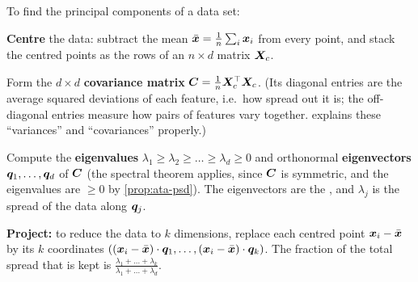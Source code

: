 \begin{algorithm}\label{alg:pca}
To find the principal components of a data set:
\begin{steps}
  \item \textbf{Centre} the data: subtract the mean $\bar{\bm{x}} = \frac1n\sum_i\bm{x}_i$
    from every point, and stack the centred points as the rows of an $n\times d$
    matrix $\bm{X}_c$.
  \item Form the $d\times d$ \textbf{covariance matrix}
    $\bm{C} = \frac1n\bm{X}_c^\top\bm{X}_c$. (Its diagonal entries are the average squared
    deviations of each feature, i.e.\ how spread out it is; the off-diagonal
    entries measure how pairs of features vary together. 
    explains these ``variances'' and ``covariances'' properly.)
  \item Compute the \textbf{eigenvalues} $\lambda_1 \ge \lambda_2 \ge \dots \ge
    \lambda_d \ge 0$ and orthonormal \textbf{eigenvectors}
    $\bm{q}_1, \dots, \bm{q}_d$ of $\bm{C}$ (the spectral theorem applies, since $\bm{C}$ is
    symmetric, and the eigenvalues are $\ge 0$ by \cref{prop:ata-psd}). The
    eigenvectors are the , and
    $\lambda_j$ is the spread of the data along $\bm{q}_j$.
  \item \textbf{Project:} to reduce the data to $k$ dimensions, replace each
    centred point $\bm{x}_i - \bar{\bm{x}}$ by its $k$ coordinates
    $\left((\bm{x}_i - \bar{\bm{x}})\cdot\bm{q}_1, \dots, (\bm{x}_i - \bar{\bm{x}})\cdot\bm{q}_k\right)$.
    The fraction of the total spread that is kept is
    $\frac{\lambda_1 + \dots + \lambda_k}{\lambda_1 + \dots + \lambda_d}$.
\end{steps}
\end{algorithm}

